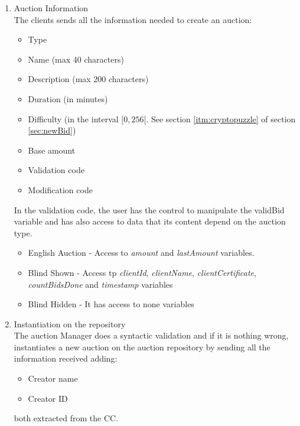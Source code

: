 \documentclass[12pt]{article}
\begin{document}
\begin{enumerate}
  \item Auction Information \\
    The clients sends all the information needed to create an auction:
    \begin{itemize}
      \item Type
      \item Name (max 40 characters)
      \item Description (max 200 characters)
      \item Duration (in minutes)
      \item Difficulty (in the interval \([0,256[\). See section \ref{itm:cryptopuzzle} of section
         \ref{sec:newBid})
      \item Base amount
      \item Validation code
      \item Modification code
    \end{itemize}
    
    In the validation code, the user has the control to manipulate the validBid variable and has also access to data that its content
    depend on the auction type.

    \begin{itemize}
      \item English Auction - Access to \textit{amount} and \textit{lastAmount} variables.
      \item Blind Shown - Access tp \textit{clientId}, \textit{clientName}, \textit{clientCertificate}, \textit{countBidsDone} and \textit{timestamp} 
      variables
      \item Blind Hidden - It has access to none variables  
    \end{itemize}


  \item Instantiation on the repository \\
    The auction Manager does a syntactic validation and if it is nothing wrong, instantiates a new auction on the auction repository by sending all the 
      information received adding:
    \begin{itemize}
      \item Creator name
      \item Creator ID
    \end{itemize}
    both extracted from the CC.


\end{enumerate}
\end{document}
